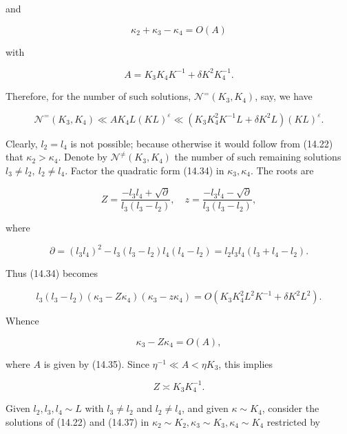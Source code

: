 \documentclass[10pt]{article}
\begin{document}
and

$$
\kappa_{2}+\kappa_{3}-\kappa_{4}=O(A)
$$

with


\begin{equation*}
A=K_{3} K_{4} K^{-1}+\delta K^{2} K_{4}^{-1} . \tag{14.35}
\end{equation*}


Therefore, for the number of such solutions, $\mathscr{N}^{=}(K_{3},K_{4})$, say, we have


\begin{equation*}
\mathscr{N}^{=}\left(K_{3}, K_{4}\right) \ll A K_{4} L(K L)^{\varepsilon} \ll\left(K_{3} K_{4}^{2} K^{-1} L+\delta K^{2} L\right)(K L)^{\varepsilon} . \tag{14.36}
\end{equation*}


Clearly, $l_{2}=l_{4}$ is not possible; because otherwise it would follow from (14.22) that $\kappa_{2}>\kappa_{4}$. Denote by $\mathscr{N}^{\neq}\left(K_{3}, K_{4}\right)$ the number of such remaining solutions $l_{3}\neq l_{2},\ l_{2}\neq l_{4}$. Factor the quadratic form (14.34) in $\kappa_{3}, \kappa_{4}$. The roots are

$$
Z=\frac{-l_{3} l_{4}+\sqrt{\partial}}{l_{3}\left(l_{3}-l_{2}\right)}, \quad z=\frac{-l_{3} l_{4}-\sqrt{\partial}}{l_{3}\left(l_{3}-l_{2}\right)},
$$

where

$$
\partial=\left(l_{3} l_{4}\right)^{2}-l_{3}\left(l_{3}-l_{2}\right) l_{4}\left(l_{4}-l_{2}\right)=l_{2} l_{3} l_{4}\left(l_{3}+l_{4}-l_{2}\right) .
$$

Thus (14.34) becomes

$$
l_{3}\left(l_{3}-l_{2}\right)\left(\kappa_{3}-Z \kappa_{4}\right)\left(\kappa_{3}-z \kappa_{4}\right)=O\left(K_{3} K_{4}^{2} L^{2} K^{-1}+\delta K^{2} L^{2}\right) .
$$

Whence


\begin{equation*}
\kappa_{3}-Z \kappa_{4}=O(A), \tag{14.37}
\end{equation*}


where $A$ is given by (14.35). Since $\eta^{-1} \ll A<\eta K_{3}$, this implies


\begin{equation*}
Z \asymp K_{3} K_{4}^{-1} . \tag{14.38}
\end{equation*}


Given $l_{2},l_{3},l_{4}\sim L$ with $l_{3}\neq l_{2}$ and $l_{2}\neq l_{4}$, and given $\kappa\sim K_{4}$, consider the solutions of (14.22) and (14.37) in $\kappa_{2} \sim K_{2}, \kappa_{3} \sim K_{3}, \kappa_{4} \sim K_{4}$ restricted by
\end{document}
